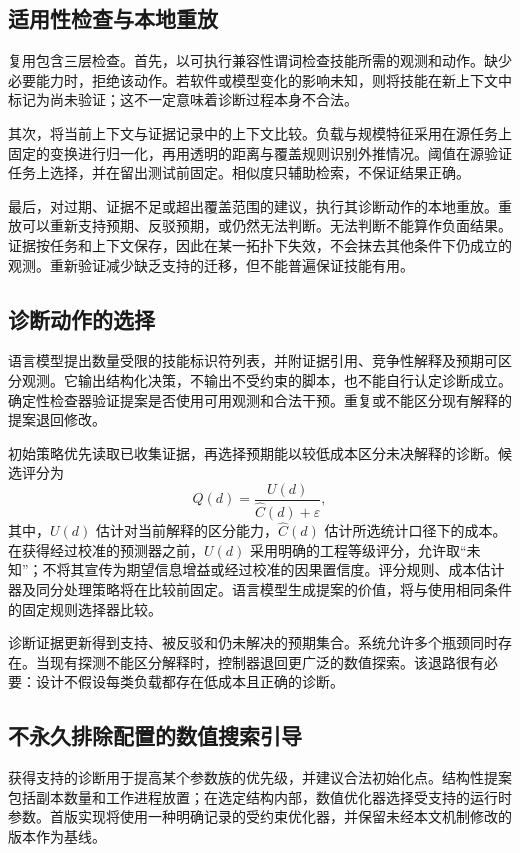 \documentclass[UTF8,11pt,a4paper,fontset=windows]{ctexart}
\begin{document}
\subsection{适用性检查与本地重放}
复用包含三层检查。首先，以可执行兼容性谓词检查技能所需的观测和动作。缺少必要能力时，拒绝该动作。若软件或模型变化的影响未知，则将技能在新上下文中标记为尚未验证；这不一定意味着诊断过程本身不合法。

其次，将当前上下文与证据记录中的上下文比较。负载与规模特征采用在源任务上固定的变换进行归一化，再用透明的距离与覆盖规则识别外推情况。阈值在源验证任务上选择，并在留出测试前固定。相似度只辅助检索，不保证结果正确。

最后，对过期、证据不足或超出覆盖范围的建议，执行其诊断动作的本地重放。重放可以重新支持预期、反驳预期，或仍然无法判断。无法判断不能算作负面结果。证据按任务和上下文保存，因此在某一拓扑下失效，不会抹去其他条件下仍成立的观测。重新验证减少缺乏支持的迁移，但不能普遍保证技能有用。

\subsection{诊断动作的选择}
语言模型提出数量受限的技能标识符列表，并附证据引用、竞争性解释及预期可区分观测。它输出结构化决策，不输出不受约束的脚本，也不能自行认定诊断成立。确定性检查器验证提案是否使用可用观测和合法干预。重复或不能区分现有解释的提案退回修改。

初始策略优先读取已收集证据，再选择预期能以较低成本区分未决解释的诊断。候选评分为
\begin{equation}
 Q(d)=\frac{U(d)}{\widehat C(d)+\varepsilon},
\end{equation}
其中，$U(d)$ 估计对当前解释的区分能力，$\widehat C(d)$ 估计所选统计口径下的成本。在获得经过校准的预测器之前，$U(d)$ 采用明确的工程等级评分，允许取“未知”；不将其宣传为期望信息增益或经过校准的因果置信度。评分规则、成本估计器及同分处理策略将在比较前固定。语言模型生成提案的价值，将与使用相同条件的固定规则选择器比较。

诊断证据更新得到支持、被反驳和仍未解决的预期集合。系统允许多个瓶颈同时存在。当现有探测不能区分解释时，控制器退回更广泛的数值探索。该退路很有必要：设计不假设每类负载都存在低成本且正确的诊断。

\subsection{不永久排除配置的数值搜索引导}
获得支持的诊断用于提高某个参数族的优先级，并建议合法初始化点。结构性提案包括副本数量和工作进程放置；在选定结构内部，数值优化器选择受支持的运行时参数。首版实现将使用一种明确记录的受约束优化器，并保留未经本文机制修改的版本作为基线。
\end{document}
